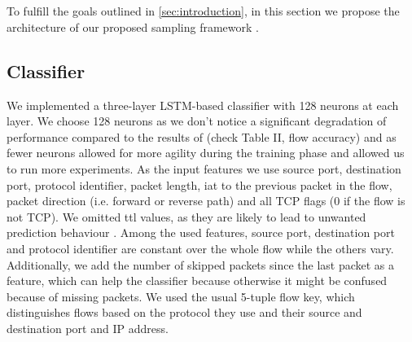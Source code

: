 \documentclass[conference]{IEEEtran}
\begin{document}

\section{\ours{}}

To fulfill the goals outlined in \autoref{sec:introduction}, in this section we propose the architecture of our proposed sampling framework \ours.

\subsection{Classifier}
\label{subsec:classifier}
We implemented a three-layer LSTM-based classifier with 128 neurons at each layer. We choose 128 neurons as we don't notice a significant degradation of performance compared to the results of \cite{hartl_explainability_2019} (check Table II, flow accuracy) and as fewer neurons allowed for more agility during the training phase and allowed us to run more experiments. As the input features we use source port, destination port, protocol identifier, packet length, \gls{iat} to the previous packet in the flow, packet direction (i.e. forward or reverse path) and all TCP flags (0 if the flow is not TCP).
We omitted \gls{ttl} values, as they are likely to lead to unwanted prediction behaviour \cite{bachl_walling_2019}.  Among the used features, source port, destination port and protocol identifier are constant over the whole flow while the others vary.
Additionally, we add the number of skipped packets since the last packet as a feature, which can help the classifier because otherwise it might be confused because of missing packets.
We used the usual 5-tuple flow key, which distinguishes flows based on the protocol they use and their source and destination port and IP address.
\end{document}
